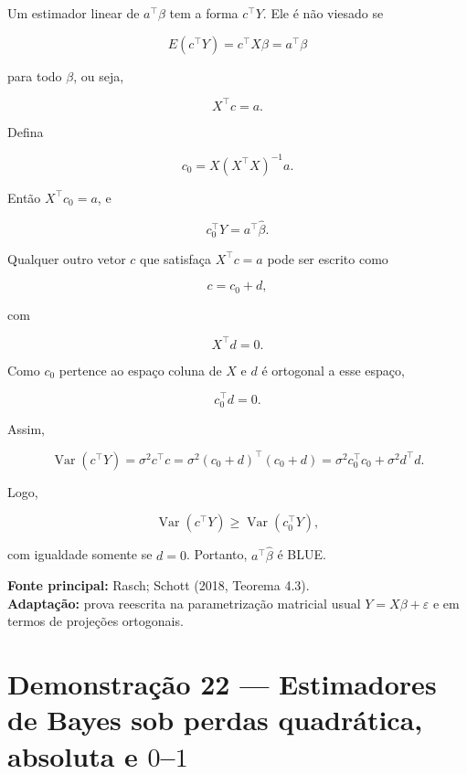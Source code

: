 \documentclass[
  letterpaper,
  DIV=11,
  numbers=noendperiod]{scrreprt}
\begin{document}
Um estimador linear de \(a^\top\beta\) tem a forma \(c^\top Y\). Ele é
não viesado se

\[
E(c^\top Y)=c^\top X\beta=a^\top\beta
\]

para todo \(\beta\), ou seja,

\[
X^\top c=a.
\]

Defina

\[
c_0=X(X^\top X)^{-1}a.
\]

Então \(X^\top c_0=a\), e

\[
c_0^\top Y=a^\top\widehat\beta.
\]

Qualquer outro vetor \(c\) que satisfaça \(X^\top c=a\) pode ser escrito
como

\[
c=c_0+d,
\]

com

\[
X^\top d=0.
\]

Como \(c_0\) pertence ao espaço coluna de \(X\) e \(d\) é ortogonal a
esse espaço,

\[
c_0^\top d=0.
\]

Assim,

\[
\operatorname{Var}(c^\top Y)
=
\sigma^2c^\top c
=
\sigma^2(c_0+d)^\top(c_0+d)
=
\sigma^2c_0^\top c_0+
\sigma^2d^\top d.
\]

Logo,

\[
\operatorname{Var}(c^\top Y)
\geq
\operatorname{Var}(c_0^\top Y),
\]

com igualdade somente se \(d=0\). Portanto, \(a^\top\widehat\beta\) é
BLUE.

\begin{tcolorbox}[enhanced jigsaw, colback=white, leftrule=.75mm, colbacktitle=quarto-callout-note-color!10!white, breakable, titlerule=0mm, bottomtitle=1mm, title=\textcolor{quarto-callout-note-color}{\faInfo}\hspace{0.5em}{Fonte da demonstração}, colframe=quarto-callout-note-color-frame, toprule=.15mm, opacityback=0, bottomrule=.15mm, opacitybacktitle=0.6, arc=.35mm, toptitle=1mm, rightrule=.15mm, coltitle=black, left=2mm]

\textbf{Fonte principal:} Rasch; Schott (2018, Teorema 4.3).\\
\textbf{Adaptação:} prova reescrita na parametrização matricial usual
\(Y=X\beta+\varepsilon\) e em termos de projeções ortogonais.

\end{tcolorbox}

\section*{\texorpdfstring{Demonstração 22 --- Estimadores de Bayes sob
perdas quadrática, absoluta e
\(0\)--\(1\)}{Demonstração 22 --- Estimadores de Bayes sob perdas quadrática, absoluta e 0--1}}\label{demonstrauxe7uxe3o-22-estimadores-de-bayes-sob-perdas-quadruxe1tica-absoluta-e-01}
\end{document}
